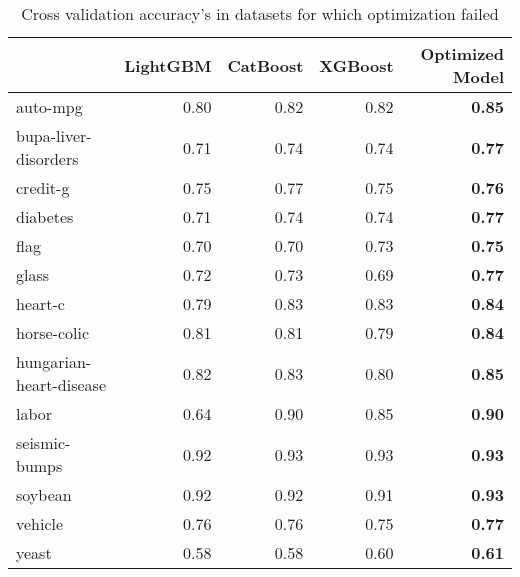 \documentclass[a4paper,twoside,12pt]{book}
\begin{document}
\begin{table}[!htb]
\centering
\begin{tabular}{lrrrr}
\toprule
{} &  LightGBM &  CatBoost &  XGBoost &  Optimized Model\\
\midrule
auto-mpg                &              0.80 &             0.82 &             0.82 &                   \textbf{0.85} \\
bupa-liver-disorders    &              0.71 &             0.74 &             0.74 &                   \textbf{0.77} \\
credit-g                &              0.75 &             0.77 &             0.75 &                   \textbf{0.76} \\
diabetes                &              0.71 &             0.74 &             0.74 &                   \textbf{0.77} \\
flag                    &              0.70 &             0.70 &             0.73 &                   \textbf{0.75} \\
glass                   &              0.72 &             0.73 &             0.69 &                   \textbf{0.77} \\
heart-c                 &              0.79 &             0.83 &             0.83 &                   \textbf{0.84} \\
horse-colic             &              0.81 &             0.81 &             0.79 &                   \textbf{0.84} \\
hungarian-heart-disease &              0.82 &             0.83 &             0.80 &                   \textbf{0.85} \\
labor                   &              0.64 &             0.90 &             0.85 &                   \textbf{0.90} \\
seismic-bumps           &              0.92 &             0.93 &             0.93 &                   \textbf{0.93} \\
soybean                 &              0.92 &             0.92 &             0.91 &                   \textbf{0.93} \\
vehicle                 &              0.76 &             0.76 &             0.75 &                   \textbf{0.77} \\
yeast                   &              0.58 &             0.58 &             0.60 &                   \textbf{0.61} \\
\bottomrule
\end{tabular}
\caption{Cross validation accuracy's in datasets for which optimization failed}
\label{tab:crossy}
\end{table}
\end{document}
